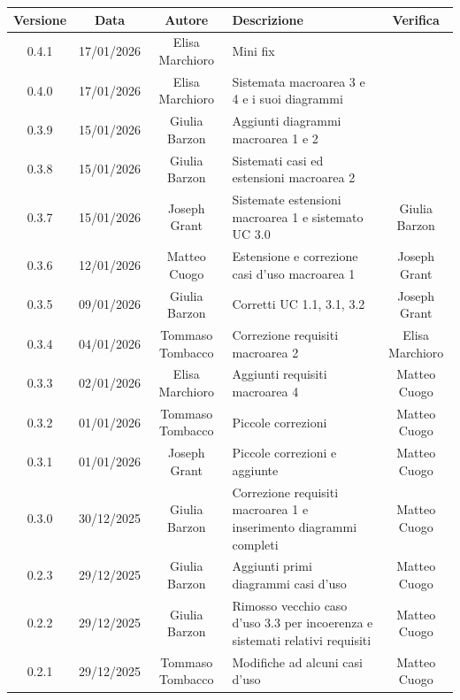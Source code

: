 \documentclass[11pt,a4paper]{article}
\begin{document}
\begin{table}[H]
    \centering
    \begin{tabular}{|c|c|c|>{\raggedright\arraybackslash}p{}|c|}
        \hline
        \textbf{Versione} & \textbf{Data} & \textbf{Autore} & \textbf{Descrizione} & \textbf{Verifica} \\
        \hline
        0.4.1 & 17/01/2026 & Elisa Marchioro & Mini fix &  \\
        \hline
        0.4.0 & 17/01/2026 & Elisa Marchioro & Sistemata macroarea 3 e 4 e i suoi diagrammi &  \\
        \hline
        0.3.9 & 15/01/2026 & Giulia Barzon & Aggiunti diagrammi macroarea 1 e 2 &  \\
        \hline
        0.3.8 & 15/01/2026 & Giulia Barzon & Sistemati casi ed estensioni macroarea 2 &  \\
        \hline
        0.3.7 & 15/01/2026 & Joseph Grant & Sistemate estensioni macroarea 1 e sistemato UC 3.0 & Giulia Barzon\\
        \hline
        0.3.6 & 12/01/2026 & Matteo Cuogo & Estensione e correzione casi d'uso macroarea 1 & Joseph Grant\\
        \hline
        0.3.5 & 09/01/2026 & Giulia Barzon & Corretti UC 1.1, 3.1, 3.2 & Joseph Grant\\
        \hline
        0.3.4 & 04/01/2026 & Tommaso Tombacco & Correzione requisiti macroarea 2 & Elisa Marchioro\\
        \hline
        0.3.3 & 02/01/2026 & Elisa Marchioro & Aggiunti requisiti macroarea 4 &  Matteo Cuogo\\
        \hline
        0.3.2 & 01/01/2026 & Tommaso Tombacco & Piccole correzioni & Matteo Cuogo\\
        \hline
        0.3.1 & 01/01/2026 & Joseph Grant & Piccole correzioni e aggiunte &  Matteo Cuogo\\
        \hline
        0.3.0 & 30/12/2025 & Giulia Barzon & Correzione requisiti macroarea 1 e inserimento diagrammi completi & Matteo Cuogo \\
        \hline
        0.2.3 & 29/12/2025 & Giulia Barzon & Aggiunti primi diagrammi casi d'uso &  Matteo Cuogo \\
        \hline
        0.2.2 & 29/12/2025 & Giulia Barzon & Rimosso vecchio caso d'uso 3.3 per incoerenza e sistemati relativi requisiti & Matteo Cuogo \\
        \hline
        0.2.1 & 29/12/2025 & Tommaso Tombacco & Modifiche ad alcuni casi d'uso &  Matteo Cuogo\\ 

\end{tabular}
\end{table}
\end{document}
